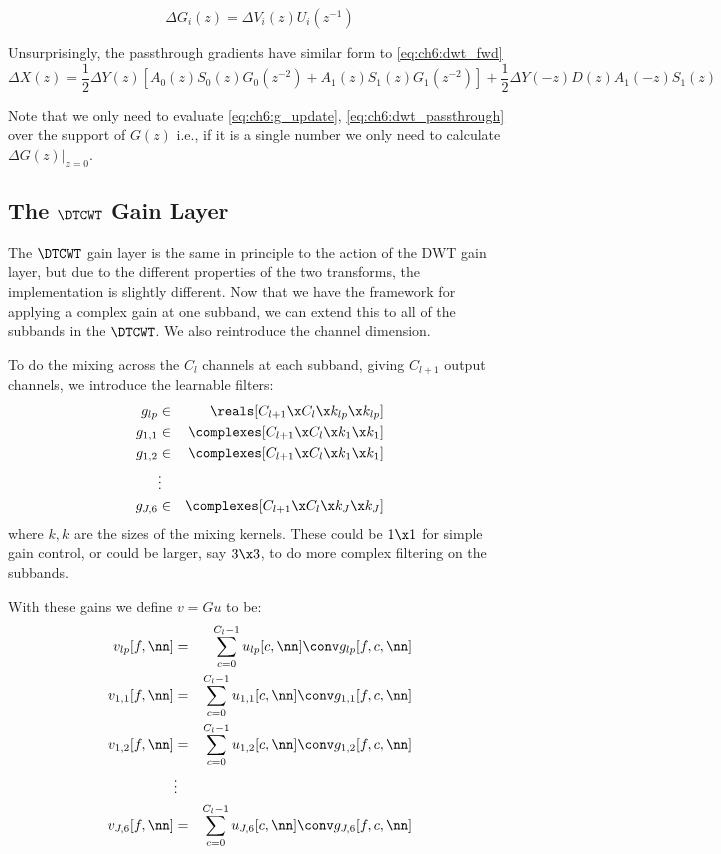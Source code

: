 \begin{equation}
  \Delta G_i(z) = \Delta V_i(z) U_i(z^{-1}) \label{eq:ch6:g_update}
\end{equation}

Unsurprisingly, the passthrough gradients have similar form to \eqref{eq:ch6:dwt_fwd}
\begin{equation}
  \Delta X(z) = \frac{1}{2} \Delta Y(z) \left[A_0(z)S_0(z)G_0(z^{-2}) + A_1(z)S_1(z)G_1(z^{-2}) \right] + 
         \frac{1}{2}\Delta Y(-z)D(z)A_1(-z)S_1(z) \label{eq:ch6:dwt_passthrough}
\end{equation}

Note that we only need to evaluate \eqref{eq:ch6:g_update},
\eqref{eq:ch6:dwt_passthrough} over the support of $G(z)$ i.e., if it is a
single number we only need to calculate $\left.\Delta G(z)\right\rvert_{z=0}$.


 
\subsection{The $\DTCWT$ Gain Layer}

The $\DTCWT$ gain layer is the same in principle to the action of the DWT gain
layer, but due to the different properties of the two transforms, the
implementation is slightly different. 
Now that we have the framework for applying a complex gain at one subband, we
can extend this to all of the subbands in the $\DTCWT$. We also reintroduce the channel
dimension. 

To do the mixing across the $C_l$ channels at each subband, giving $C_{l+1}$
output channels, we introduce the learnable filters:
%
\begin{eqnarray}
  g_{lp} &\in& \reals[C_{l+1}\x C_l\x k_{lp}\x k_{lp}] \label{eq:ch6:glp} \\
  g_{1,1} &\in& \complexes[C_{l+1}\x C_l\x k_1\x k_1] \\
  g_{1,2} &\in& \complexes[C_{l+1}\x C_l\x k_1\x k_1] \\
      & \vdots &\\
  g_{J,6} &\in& \complexes[C_{l+1}\x C_l\x k_J\x k_J]  \label{eq:ch6:gj6}
\end{eqnarray}
%
where $k, k$ are the sizes of the mixing kernels. These could be $1\x 1$ for
simple gain control, or could be larger, say $3\x 3$, to do more complex
filtering on the subbands. 

With these gains we define $v = Gu$ to be:
\begin{eqnarray}
  v_{lp}[f, \nn] &= & \sum_{c=0}^{C_l-1} u_{lp}[c, \nn] \conv g_{lp}[f, c, \nn] \\
  v_{1,1}[f, \nn] &= & \sum_{c=0}^{C_l-1} u_{1,1}[c, \nn] \conv g_{1,1}[f, c, \nn] \\
  v_{1,2}[f, \nn] &= & \sum_{c=0}^{C_l-1} u_{1,2}[c, \nn] \conv g_{1,2}[f, c, \nn] \\
                  & \vdots & \\
  v_{J,6}[f, \nn] &= & \sum_{c=0}^{C_l-1} u_{J,6}[c, \nn] \conv g_{J,6}[f, c, \nn] 
\end{eqnarray}

